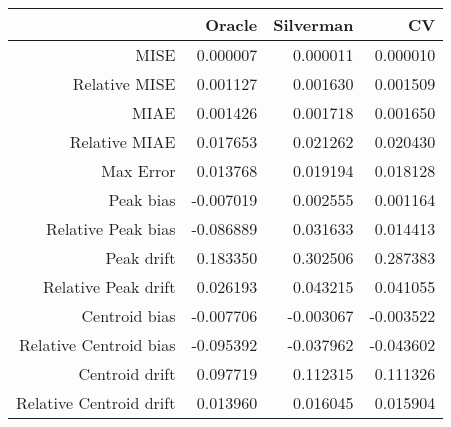 \begin{tabular}{rrrr}
  \hline
 & Oracle & Silverman & CV \\ 
  \hline
MISE & 0.000007 & 0.000011 & 0.000010 \\ 
  Relative MISE & 0.001127 & 0.001630 & 0.001509 \\ 
  MIAE & 0.001426 & 0.001718 & 0.001650 \\ 
  Relative MIAE & 0.017653 & 0.021262 & 0.020430 \\ 
  Max Error & 0.013768 & 0.019194 & 0.018128 \\ 
  Peak bias & -0.007019 & 0.002555 & 0.001164 \\ 
  Relative Peak bias & -0.086889 & 0.031633 & 0.014413 \\ 
  Peak drift & 0.183350 & 0.302506 & 0.287383 \\ 
  Relative Peak drift & 0.026193 & 0.043215 & 0.041055 \\ 
  Centroid bias & -0.007706 & -0.003067 & -0.003522 \\ 
  Relative Centroid bias & -0.095392 & -0.037962 & -0.043602 \\ 
  Centroid drift & 0.097719 & 0.112315 & 0.111326 \\ 
  Relative Centroid drift & 0.013960 & 0.016045 & 0.015904 \\ 
   \hline
\end{tabular}
